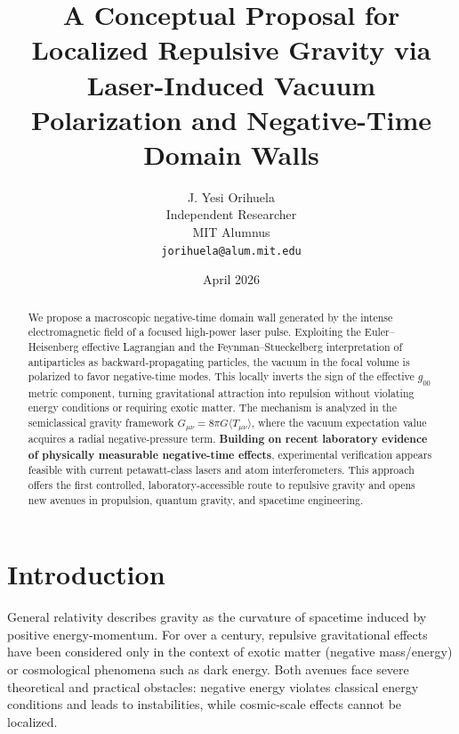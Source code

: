 \documentclass[11pt,a4paper]{article}
\begin{document}
\title{\textbf{A Conceptual Proposal for Localized Repulsive Gravity via Laser-Induced Vacuum Polarization and Negative-Time Domain Walls}}

\author{J. Yesi Orihuela \\
\small Independent Researcher \\
\small MIT Alumnus \\
\small \texttt{jorihuela@alum.mit.edu}}

\date{April 2026}

\maketitle

\begin{abstract}
We propose a macroscopic negative-time domain wall generated by the intense electromagnetic field of a focused high-power laser pulse. Exploiting the Euler--Heisenberg effective Lagrangian and the Feynman--Stueckelberg interpretation of antiparticles as backward-propagating particles, the vacuum in the focal volume is polarized to favor negative-time modes. This locally inverts the sign of the effective $g_{00}$ metric component, turning gravitational attraction into repulsion without violating energy conditions or requiring exotic matter. The mechanism is analyzed in the semiclassical gravity framework $G_{\mu\nu} = 8\pi G \langle T_{\mu\nu}\rangle$, where the vacuum expectation value acquires a radial negative-pressure term. \textbf{Building on recent laboratory evidence of physically measurable negative-time effects}, experimental verification appears feasible with current petawatt-class lasers and atom interferometers. This approach offers the first controlled, laboratory-accessible route to repulsive gravity and opens new avenues in propulsion, quantum gravity, and spacetime engineering.
\end{abstract}

\section{Introduction}

General relativity describes gravity as the curvature of spacetime induced by positive energy-momentum. For over a century, repulsive gravitational effects have been considered only in the context of exotic matter (negative mass/energy) or cosmological phenomena such as dark energy. Both avenues face severe theoretical and practical obstacles: negative energy violates classical energy conditions and leads to instabilities, while cosmic-scale effects cannot be localized.
\end{document}
